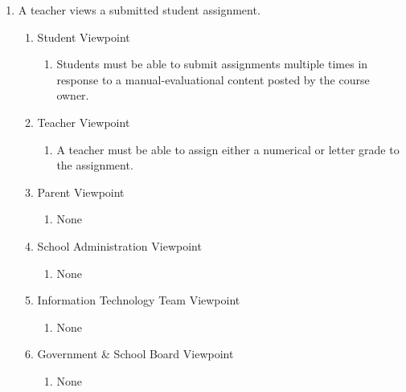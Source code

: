 \documentclass[]{article}
\begin{document}
\begin{enumerate}[{BE}1.]
	\item A teacher views a submitted student assignment.
	\begin{enumerate}[{VP2}.1]
		\item Student Viewpoint
			\begin{enumerate}
				\item Students must be able to submit assignments multiple times in response to a manual-evaluational content posted by the course owner.
			\end{enumerate}
		\item Teacher Viewpoint
			\begin{enumerate}
				\item A teacher must be able to assign either a numerical or letter grade to the assignment.
			\end{enumerate}
		\item Parent Viewpoint
			\begin{enumerate}
				\item None
			\end{enumerate}
		\item School Administration Viewpoint
			\begin{enumerate}
				\item None
			\end{enumerate}
		\item Information Technology Team Viewpoint
			\begin{enumerate}
				\item None
			\end{enumerate}
		\item Government \& School Board Viewpoint
			\begin{enumerate}
				\item None
			\end{enumerate}
	\end{enumerate}


\end{enumerate}
\end{document}
